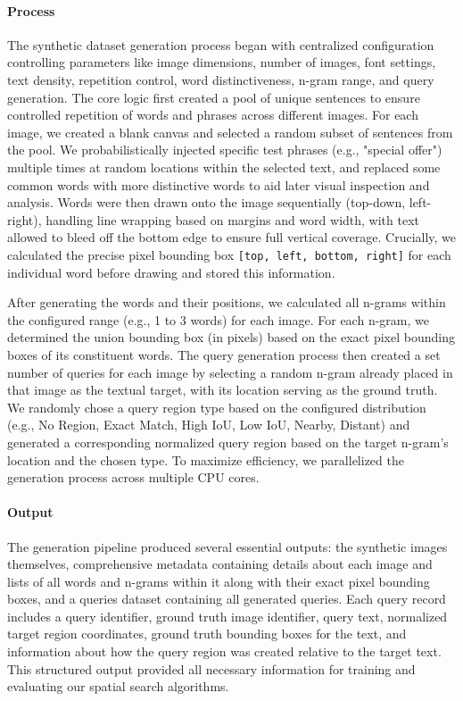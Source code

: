 \documentclass[manuscript,screen]{acmart}
\begin{document}
\paragraph{Process} The synthetic dataset generation process began with centralized configuration controlling parameters like image dimensions, number of images, font settings, text density, repetition control, word distinctiveness, n-gram range, and query generation. The core logic first created a pool of unique sentences to ensure controlled repetition of words and phrases across different images. For each image, we created a blank canvas and selected a random subset of sentences from the pool. We probabilistically injected specific test phrases (e.g., "special offer") multiple times at random locations within the selected text, and replaced some common words with more distinctive words to aid later visual inspection and analysis. Words were then drawn onto the image sequentially (top-down, left-right), handling line wrapping based on margins and word width, with text allowed to bleed off the bottom edge to ensure full vertical coverage. Crucially, we calculated the precise pixel bounding box \verb|[top, left, bottom, right]| for each individual word before drawing and stored this information.

After generating the words and their positions, we calculated all n-grams within the configured range (e.g., 1 to 3 words) for each image. For each n-gram, we determined the union bounding box (in pixels) based on the exact pixel bounding boxes of its constituent words. The query generation process then created a set number of queries for each image by selecting a random n-gram already placed in that image as the textual target, with its location serving as the ground truth. We randomly chose a query region type based on the configured distribution (e.g., No Region, Exact Match, High IoU, Low IoU, Nearby, Distant) and generated a corresponding normalized query region based on the target n-gram's location and the chosen type. To maximize efficiency, we parallelized the generation process across multiple CPU cores.

\paragraph{Output} The generation pipeline produced several essential outputs: the synthetic images themselves, comprehensive metadata containing details about each image and lists of all words and n-grams within it along with their exact pixel bounding boxes, and a queries dataset containing all generated queries. Each query record includes a query identifier, ground truth image identifier, query text, normalized target region coordinates, ground truth bounding boxes for the text, and information about how the query region was created relative to the target text. This structured output provided all necessary information for training and evaluating our spatial search algorithms.
\end{document}

